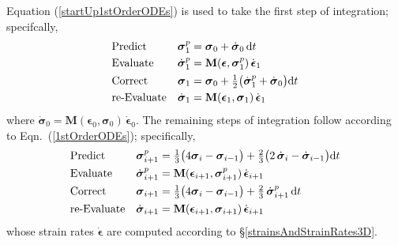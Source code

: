 Equation (\ref{startUp1stOrderODEs}) is used to take the first step of integration; specifcally, 
\begin{subequations}
    \notag
    \begin{align}
    \mbox{} & \text{Predict} & 
    \boldsymbol{\sigma}_1^p & = \boldsymbol{\sigma}_0 + \dot{\boldsymbol{\sigma}}_0 \, \mathrm{d}t \\
    \mbox{} & \text{Evaluate} & 
    \dot{\boldsymbol{\sigma}}^p_1 & = \mathbf{M} ( \boldsymbol{\epsilon} , \boldsymbol{\sigma}_1^p ) \, \dot{\boldsymbol{\epsilon}}_1 \\
    \mbox{} & \text{Correct} &
    \boldsymbol{\sigma}_1 & = \boldsymbol{\sigma}_0 + \tfrac{1}{2} 
    \bigl( \dot{\boldsymbol{\sigma}}_1^p + 
    \dot{\boldsymbol{\sigma}}_0 \bigr) \mathrm{d} t \\
    \mbox{} & \text{re-Evaluate} & 
    \dot{\boldsymbol{\sigma}}_1 & = \mathbf{M} ( \boldsymbol{\epsilon}_1 , \boldsymbol{\sigma}_1 ) \, \dot{\boldsymbol{\epsilon}}_1
    \end{align}
\end{subequations}
where $\dot{\boldsymbol{\sigma}}_0 = \mathbf{M} ( \boldsymbol{\epsilon}_0 , \boldsymbol{\sigma}_0 ) \, \dot{\boldsymbol{\epsilon}}_0$.  The remaining steps of integration follow according to Eqn.~(\ref{1stOrderODEs}); specifically,
\begin{subequations}
    \notag
    \begin{align}
    \mbox{} & \text{Predict} & 
    \boldsymbol{\sigma}_{i+1}^p & = \tfrac{1}{3} 
    \bigl( 4 \boldsymbol{\sigma}_i - \boldsymbol{\sigma}_{i-1} \bigr) + 
    \tfrac{2}{3} \bigl( 2 \, \dot{\boldsymbol{\sigma}}_i - 
    \dot{\boldsymbol{\sigma}}_{i-1} \bigr) \mathrm{d} t \\
    \mbox{} & \text{Evaluate} & 
    \dot{\boldsymbol{\sigma}}^p_{i+1} & = \mathbf{M} ( \boldsymbol{\epsilon}_{i+1} , \boldsymbol{\sigma}_{i+1}^p ) \, \dot{\boldsymbol{\epsilon}}_{i+1} \\
    \mbox{} & \text{Correct} &
    \boldsymbol{\sigma}_{i+1} & = \tfrac{1}{3} 
    \bigl( 4 \boldsymbol{\sigma}_i - \boldsymbol{\sigma}_{i-1} \bigr) + 
    \tfrac{2}{3} \, \dot{\boldsymbol{\sigma}}^{p}_{i+1} \, \mathrm{d}t \\
    \mbox{} & \text{re-Evaluate} & 
    \dot{\boldsymbol{\sigma}}_{i+1} & = \mathbf{M} ( \boldsymbol{\epsilon}_{i+1} , 
    \boldsymbol{\sigma}_{i+1} ) \, \dot{\boldsymbol{\epsilon}}_{i+1}
    \end{align}
\end{subequations} 
whose strain rates $\dot{\boldsymbol{\epsilon}}$ are computed according to \S\ref{strainsAndStrainRates3D}.


